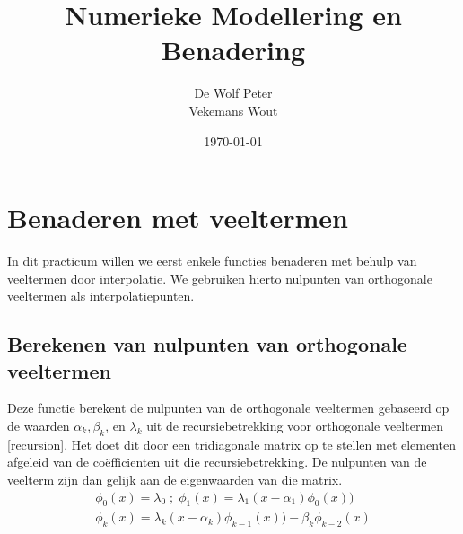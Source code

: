 \documentclass[a4paper, 12pt, titlepage]{report}
\begin{document}
\title{\textbf{Numerieke Modellering en Benadering}}
\author{De Wolf Peter\\ Vekemans Wout}

\date{\today}
\begin{titlepage}
	\maketitle
	\thispagestyle{empty}
\end{titlepage}

\newpage
\tableofcontents

\listoffigures

\newpage
\section{Benaderen met veeltermen}
In dit practicum willen we eerst enkele functies benaderen met behulp van veeltermen door interpolatie. We gebruiken hierto nulpunten van orthogonale veeltermen als interpolatiepunten.
\subsection{Berekenen van nulpunten van orthogonale veeltermen}

Deze functie berekent de nulpunten van de orthogonale veeltermen gebaseerd op de waarden $\alpha_k, \beta_k$, en $\lambda_k$ uit de recursiebetrekking voor orthogonale veeltermen \eqref{recursion}. Het doet dit door een tridiagonale matrix op te stellen met elementen afgeleid van de co\"efficienten uit die recursiebetrekking. De nulpunten van de veelterm zijn dan gelijk aan de eigenwaarden van die matrix.\\
\begin{subequations} \label{recursion}
\begin{align}
\phi_0(x) = \lambda_0\; ;\; \phi_1(x) = \lambda_1(x-\alpha_1)\phi_0(x))\\
\phi_k(x) = \lambda_k(x-\alpha_k)\phi_{k-1}(x))-\beta_k\phi_{k-2}(x)
\end{align}
\end{subequations}
\end{document}
